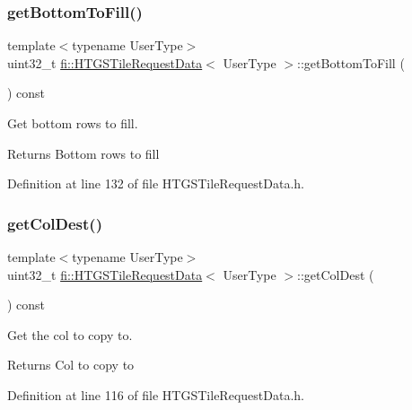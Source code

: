 \subsubsection{\texorpdfstring{get\+Bottom\+To\+Fill()}{getBottomToFill()}}
{\footnotesize\ttfamily template$<$typename User\+Type$>$ \\
uint32\+\_\+t \hyperlink{classfi_1_1HTGSTileRequestData}{fi\+::\+H\+T\+G\+S\+Tile\+Request\+Data}$<$ User\+Type $>$\+::get\+Bottom\+To\+Fill (\begin{DoxyParamCaption}{ }\end{DoxyParamCaption}) const\hspace{0.3cm}{\ttfamily [inline]}}



Get bottom rows to fill. 

\begin{DoxyReturn}{Returns}
Bottom rows to fill 
\end{DoxyReturn}


Definition at line 132 of file H\+T\+G\+S\+Tile\+Request\+Data.\+h.

\mbox{\label{classfi_1_1HTGSTileRequestData_a2715f7cae917ededbc0bad0a20aa3e24}} 
\subsubsection{\texorpdfstring{get\+Col\+Dest()}{getColDest()}}
{\footnotesize\ttfamily template$<$typename User\+Type$>$ \\
uint32\+\_\+t \hyperlink{classfi_1_1HTGSTileRequestData}{fi\+::\+H\+T\+G\+S\+Tile\+Request\+Data}$<$ User\+Type $>$\+::get\+Col\+Dest (\begin{DoxyParamCaption}{ }\end{DoxyParamCaption}) const\hspace{0.3cm}{\ttfamily [inline]}}



Get the col to copy to. 

\begin{DoxyReturn}{Returns}
Col to copy to 
\end{DoxyReturn}


Definition at line 116 of file H\+T\+G\+S\+Tile\+Request\+Data.\+h.

